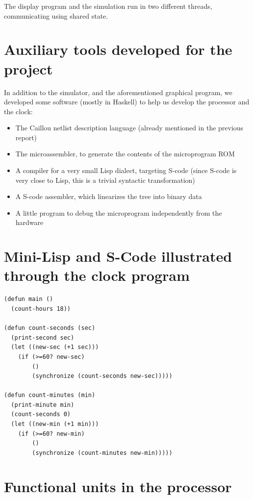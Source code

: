\documentclass[a4paper, 11pt]{article}
\begin{document}
The display program and the simulation run in two different threads, communicating using shared state.


\section{Auxiliary tools developed for the project}

In addition to the simulator, and the aforementioned graphical program, we developed some software (mostly in Haskell) to help us develop the processor and the clock:
\begin{itemize}
\item The Caillou netlist description language (already mentioned in the previous report)
\item The microassembler, to generate the contents of the microprogram ROM
\item A compiler for a very small Lisp dialect, targeting S-code (since S-code is very close to Lisp, this is a trivial syntactic transformation)
\item A S-code assembler, which linearizes the tree into binary data
\item A little program to debug the microprogram independently from the hardware
\end{itemize}


\newpage
\appendix


\section{Mini-Lisp and S-Code illustrated through the clock program}


\begin{lstlisting}
(defun main ()
  (count-hours 18))

(defun count-seconds (sec)
  (print-second sec)
  (let ((new-sec (+1 sec)))
    (if (>=60? new-sec)
        ()  
        (synchronize (count-seconds new-sec)))))

(defun count-minutes (min)
  (print-minute min)
  (count-seconds 0)
  (let ((new-min (+1 min)))
    (if (>=60? new-min)
        ()  
        (synchronize (count-minutes new-min)))))
\end{lstlisting}

\newpage
\section{Functional units in the processor}
\end{document}
